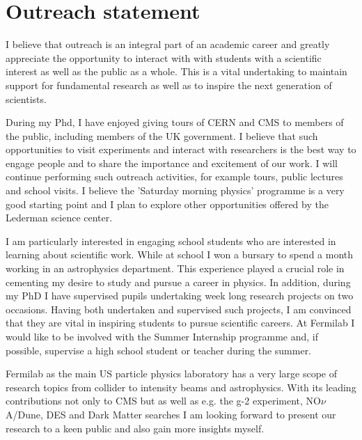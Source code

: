\documentclass[12pt]{article}
\theoremstyle{plain} \numberwithin{equation}{section}
\theoremstyle{definition}
\begin{document}
\section*{Outreach statement}
\noindent 
I believe that outreach is an integral part of an academic career and greatly appreciate the opportunity 
to interact with with students with a scientific interest as well as the public as a whole. This is a vital 
undertaking to maintain support for fundamental research as well as to inspire the next generation of scientists.

During my Phd, I have enjoyed giving tours of CERN and CMS to members of the public, 
including members of the UK government. I believe that such opportunities to visit experiments
and interact with researchers is the best way to engage people and to share the importance and 
excitement of our work. I will continue performing such outreach activities, for example tours, 
public lectures and school visits. I believe the  ’Saturday morning physics’ programme is a very
good starting point and I plan to explore other opportunities offered by the Lederman science center. 

I am particularly interested in engaging school students who are interested in learning 
about scientific work. While at school I won a bursary to spend a month working in an 
astrophysics department. This experience played a crucial role in cementing my desire
to study and pursue a career in physics. In addition, during my PhD I have supervised pupils undertaking 
week long research projects on two occasions. Having both undertaken and supervised such projects, I am convinced that they are vital 
in inspiring students to pursue scientific careers. At Fermilab I would like to be involved 
with the Summer Internship programme and, if possible, supervise a high school student or teacher during the summer.

Fermilab as the main US particle physics laboratory has a very large scope of research topics from 
collider to intensity beams and astrophysics. With its leading contributions not only to CMS but as well 
as e.g. the g-2 experiment, NO$\nu$A/Dune, DES and Dark Matter searches I am looking forward to present our 
research to a keen public and also gain more insights myself.
\end{document}

